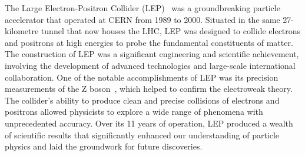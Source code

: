    The Large Electron-Positron Collider (LEP)~\cite{Schopper:2009zz} was a groundbreaking particle accelerator that operated at CERN from 1989 to 2000. 
    Situated in the same 27-kilometre tunnel that now houses the LHC, LEP was designed to collide electrons and positrons at high 
    energies to probe the fundamental constituents of matter. The construction of LEP was a significant engineering and scientific 
    achievement, involving the development of advanced technologies and large-scale international collaboration. One of the 
    notable accomplishments of LEP was its precision measurements of the Z boson~\cite{ALEPH:2007brf}, which helped to confirm the electroweak theory. 
    The collider's ability to produce clean and precise collisions of electrons and positrons allowed physicists to explore a wide 
    range of phenomena with unprecedented accuracy. Over its 11 years of operation, LEP produced a wealth of scientific results 
    that significantly enhanced our understanding of particle physics and laid the groundwork for future discoveries.

